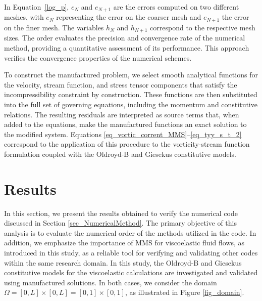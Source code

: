 \documentclass[preprint, 12pt]{elsarticle}
\begin{document}
In Equation~\eqref{log_p}, $e_{N}$ and $e_{N+1}$ are the errors computed on two different meshes, with $e_{N}$ representing the error on the coarser mesh and $e_{N+1}$ the error on the finer mesh. The variables $h_{N}$ and $h_{N+1}$ correspond to the respective mesh sizes. The order evaluates the precision and convergence rate of the numerical method, providing a quantitative assessment of its performance. This approach verifies the convergence properties of the numerical schemes.

{\color{red} To construct the manufactured problem, we select smooth analytical functions
for the velocity, stream function, and stress tensor components that satisfy
the incompressibility constraint by construction. These functions are then
substituted into the full set of governing equations, including the momentum
and constitutive relations. The resulting residuals are interpreted as source
terms that, when added to the equations, make the manufactured functions an
exact solution to the modified system. Equations
\eqref{eq_vortic_corrent_MMS}–\eqref{eq_tyy_s_t_2} correspond to the
application of this procedure to the vorticity-stream function formulation
coupled with the Oldroyd-B and Giesekus constitutive models.}

\section{Results}\label{sec_Results}

In this section, we present the results obtained to verify the numerical code
discussed in Section \ref{sec_NumericalMethod}. The primary objective of this
analysis is to evaluate the numerical order of the methods utilized in the
code. In addition, we emphasize the importance of MMS for viscoelastic fluid
flows, as introduced in this study, as a reliable tool for verifying and
validating other codes within the same research domain. In this study, the
Oldroyd-B and Giesekus constitutive models for the viscoelastic calculations
are investigated and validated using manufactured solutions. In both cases, we
consider the domain $\Omega = [0,L]\times[0,L] = [0,1]\times[0,1]$, as
illustrated in Figure \ref{fig_domain}.
\end{document}
